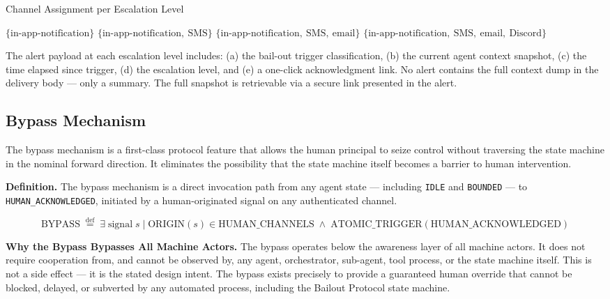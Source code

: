 \bigskip

\begin{algorithm}
\caption{Channel Assignment per Escalation Level}
\label{alg:channels}
\begin{algorithmic}[1]
        \State \Return $\{\text{in-app-notification}\}$
        \State \Return $\{\text{in-app-notification},\ \text{SMS}\}$
        \State \Return $\{\text{in-app-notification},\ \text{SMS},\ \text{email}\}$
        \State \Return $\{\text{in-app-notification},\ \text{SMS},\ \text{email},\ \text{Discord}\}$
    \EndIf
\EndFunction
\end{algorithmic}
\end{algorithm}

\bigskip

The alert payload at each escalation level includes: (a) the bail-out trigger classification, (b) the current agent context snapshot, (c) the time elapsed since trigger, (d) the escalation level, and (e) a one-click acknowledgment link. No alert contains the full context dump in the delivery body — only a summary. The full snapshot is retrievable via a secure link presented in the alert.

\bigskip

\subsection{Bypass Mechanism}

The bypass mechanism is a first-class protocol feature that allows the human principal to seize control without traversing the state machine in the nominal forward direction. It eliminates the possibility that the state machine itself becomes a barrier to human intervention.

\bigskip

\noindent\textbf{Definition.} The bypass mechanism is a direct invocation path from any agent state — including \texttt{IDLE} and \texttt{BOUNDED} — to \texttt{HUMAN\_ACKNOWLEDGED}, initiated by a human-originated signal on any authenticated channel.

\[
\text{BYPASS} \; \overset{\text{def}}{=} \; \exists \; \text{signal} \; s \;|\; \text{ORIGIN}(s) \in \text{HUMAN\_CHANNELS} \;\land\; \text{ATOMIC\_TRIGGER}(\text{HUMAN\_ACKNOWLEDGED})
\]

\bigskip

\noindent\textbf{Why the Bypass Bypasses All Machine Actors.} The bypass operates below the awareness layer of all machine actors. It does not require cooperation from, and cannot be observed by, any agent, orchestrator, sub-agent, tool process, or the state machine itself. This is not a side effect — it is the stated design intent. The bypass exists precisely to provide a guaranteed human override that cannot be blocked, delayed, or subverted by any automated process, including the Bailout Protocol state machine.

